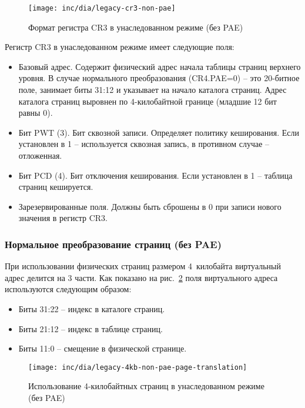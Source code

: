 \begin{figure}[ht]
  \centering
  \texttt{[image: inc/dia/legacy-cr3-non-pae]}
  \caption{Формат регистра CR3 в унаследованном режиме (без PAE)}
  \label{fig:legacy-cr3-non-pae}
\end{figure}

Регистр CR3 в унаследованном режиме имеет следующие поля:
\begin{itemize}
\item Базовый адрес. Содержит физический адрес начала таблицы страниц верхнего уровня. В случае нормального
	преобразования (CR4.PAE=0) -- это 20-битное поле, занимает биты 31:12 и указывает на начало
	каталога страниц. Адрес каталога страниц выровнен по 4-килобайтной границе (младшие 12 бит равны 0).
\item Бит PWT (3). Бит сквозной записи. Определяет политику кеширования. Если установлен в 1 --
	используется сквозная запись, в противном случае -- отложенная.
\item Бит PCD (4). Бит отключения кеширования. Если установлен в 1 -- таблица страниц кешируется.
\item Зарезервированные поля. Должны быть сброшены в 0 при записи нового значения в регистр CR3.
\end{itemize}

\subsubsection*{Нормальное преобразование страниц (без PAE)}
При использовании физических страниц размером 4~килобайта виртуальный адрес делится на 3 части.
Как показано на рис.~\ref{fig:legacy-4kb-non-pae-page-translation} поля виртуального адреса
используются следующим образом:
\begin{itemize}
\item Биты 31:22 -- индекс в каталоге страниц.
\item Биты 21:12 -- индекс в таблице страниц.
\item Биты 11:0 -- смещение в физической странице.
\end{itemize}

\begin{figure}[ht]
  \centering
  \texttt{[image: inc/dia/legacy-4kb-non-pae-page-translation]}
  \caption{Использование 4-килобайтных страниц в унаследованном режиме (без PAE)}
  \label{fig:legacy-4kb-non-pae-page-translation}
\end{figure}

